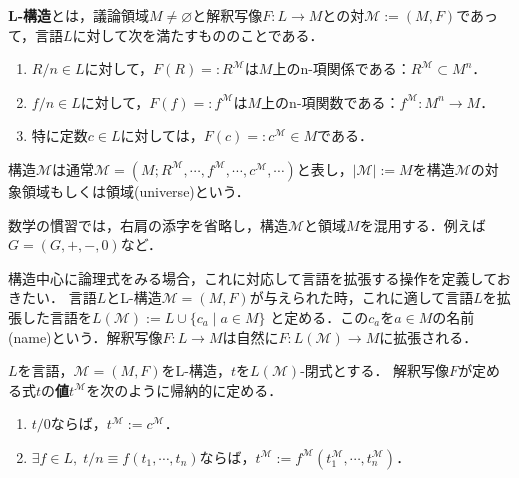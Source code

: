 \documentclass[uplatex,dvipdfmx]{jsarticle}
\begin{document}
\begin{definition}[structure]
    \textbf{L-構造}とは，議論領域$M\ne\varnothing$と解釈写像$F:L\to M$との対$\mathcal{M}:=(M,F)$であって，言語$L$に対して次を満たすもののことである．
    \begin{enumerate}
        \item $R/n\in L$に対して，$F(R)=:R^\mathcal{M}$は$M$上のn-項関係である：$R^\mathcal{M}\subset M^n$．
        \item $f/n\in L$に対して，$F(f)=:f^\mathcal{M}$は$M$上のn-項関数である：$f^\mathcal{M}:M^n\to M$．
        \item 特に定数$c\in L$に対しては，$F(c)=:c^\mathcal{M}\in M$である．
    \end{enumerate}
    構造$\mathcal{M}$は通常$\mathcal{M}=(M;R^\mathcal{M},\cdots,f^\mathcal{M},\cdots,c^\mathcal{M},\cdots)$と表し，$|\mathcal{M}|:=M$を構造$\mathcal{M}$の対象領域もしくは領域(universe)という．
\end{definition}
\begin{remark}
    数学の慣習では，右肩の添字を省略し，構造$\mathcal{M}$と領域$M$を混用する．例えば$G=(G,+,-,0)$など．
\end{remark}

構造中心に論理式をみる場合，これに対応して言語を拡張する操作を定義しておきたい．
言語$L$とL-構造$\mathcal{M}=(M,F)$が与えられた時，これに適して言語$L$を拡張した言語を$L(\mathcal{M}):=L\cup\{c_a\mid a\in M\}$
と定める．この$c_a$を$a\in M$の名前(name)という．解釈写像$F:L\to M$は自然に$F:L(\mathcal{M})\to M$に拡張される．

\begin{definition}
    $L$を言語，$\mathcal{M}=(M,F)$をL-構造，$t$を$L(\mathcal{M})$-閉式とする．
    解釈写像$F$が定める式$t$の\textbf{値}$t^\mathcal{M}$を次のように帰納的に定める．
    \begin{enumerate}
        \item $t/0$ならば，$t^\mathcal{M}:=c^\mathcal{M}$．
        \item $\exists f\in L,\; t/n\equiv f(t_1,\cdots,t_n)$ならば，$t^\mathcal{M}:=f^\mathcal{M}(t^\mathcal{M}_1,\cdots,t^\mathcal{M}_n)$．
    \end{enumerate}
\end{definition}
\end{document}
